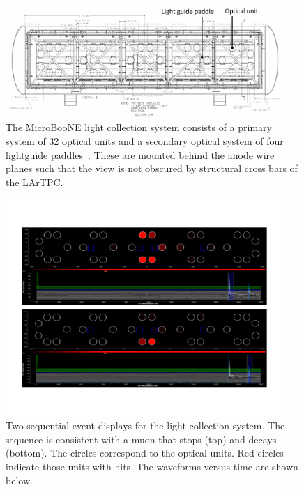 \begin{figure}[t]
	\centering
              \includegraphics[width=0.95\textwidth]{./light_figures/PMTPlacement.pdf} 
        \caption{The MicroBooNE light collection system consists of a primary system of 32 optical units and a secondary optical system of four lightguide paddles~\cite{Katori:2013wqa}. These are mounted behind the anode wire planes such that the view is not obscured by structural cross bars of the LArTPC. }\label{fig:lightlayout}
\end{figure}

\begin{figure}[t]
	\centering
    \includegraphics[width=0.95\textwidth]{./light_figures/muondecay.pdf} 
    \caption{Two sequential event displays for the light collection system.  The sequence is consistent with a muon that stops (top) and decays (bottom).  The circles correspond to the optical units. Red circles indicate those units with hits.    The waveforms versus time are shown below.}\label{fig:muondecaylight}
\end{figure}

